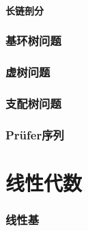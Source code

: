 \documentclass[12pt,a4paper]{article}
\begin{document}
\subsection{长链剖分}

\newpage
\section{基环树问题}

\newpage
\section{虚树问题}

\newpage
\section{支配树问题}

\newpage
\section{Prüfer序列}

\newpage
\part{线性代数}
\section{线性基}
\end{document}
